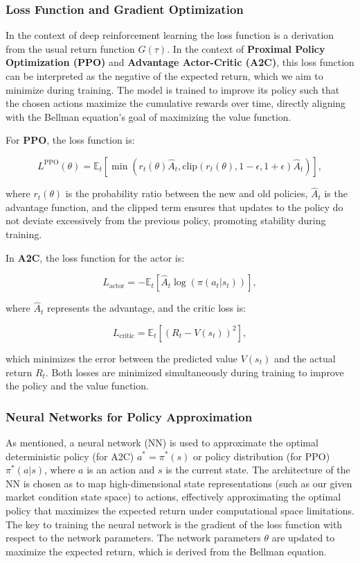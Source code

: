 \subsubsection{Loss Function and Gradient Optimization}

In the context of deep reinforcement learning the loss function is a derivation from the usual return function \( G(\tau) \).
In the context of \textbf{Proximal Policy Optimization (PPO)} and \textbf{Advantage Actor-Critic (A2C)},
this loss function can be interpreted as the negative of the expected return, which we aim to minimize during training.
The model is trained to improve its policy such that the chosen actions maximize the cumulative rewards over time,
directly aligning with the Bellman equation's goal of maximizing the value function.

For \textbf{PPO}, the loss function is:

\[
    L^{\text{PPO}}(\theta) = \mathbb{E}_t \left[ \min \left( r_t(\theta) \hat{A}_t, \text{clip}(r_t(\theta), 1 - \epsilon, 1 + \epsilon) \hat{A}_t \right) \right],
\]

where \( r_t(\theta) \) is the probability ratio between the new and old policies, \( \hat{A}_t \) is the advantage function,
and the clipped term ensures that updates to the policy do not deviate excessively from the previous policy, promoting stability during training.

In \textbf{A2C}, the loss function for the actor is:

\[
    L_{\text{actor}} = - \mathbb{E}_t \left[ \hat{A}_t \log(\pi(a_t | s_t)) \right],
\]

where \( \hat{A}_t \) represents the advantage, and the critic loss is:

\[
    L_{\text{critic}} = \mathbb{E}_t \left[ \left( R_t - V(s_t) \right)^2 \right],
\]

which minimizes the error between the predicted value \( V(s_t) \) and the actual return \( R_t \). Both losses are minimized simultaneously during training to improve the policy and the value function.

\subsubsection{Neural Networks for Policy Approximation}

As mentioned, a neural network (NN) is used to approximate the optimal deterministic policy (for A2C) $a^* = \pi^*(s)$ or policy distribution (for PPO) $\pi^*(a | s)$, where $a$ is an action and $s$ is the current state. The architecture of the NN is chosen as to map high-dimensional state representations (such as our given market condition state space) to actions, effectively approximating the optimal policy that maximizes the expected return under computational space limitations. The key to training the neural network is the gradient of the loss function with respect to the network parameters. The network parameters $\theta$ are updated to maximize the expected return, which is derived from the Bellman equation.

